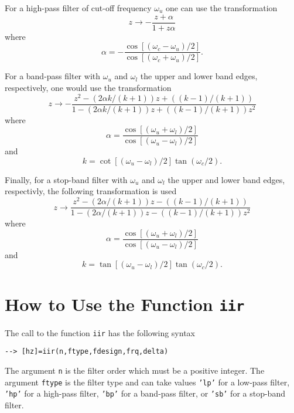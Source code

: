 	For a high-pass filter of cut-off frequency $\omega_u$ one can use
the transformation
%
\begin{equation}
z\rightarrow-\frac{z+\alpha}{1+z\alpha}
\label{e.iir.c}
\end{equation}
%
where
%
\begin{equation}
\alpha=-\frac{\cos[(\omega_c-\omega_u)/2]}{\cos[(\omega_c+\omega_u)/2]}.
\label{e.iir.d}
\end{equation}
%

	For a band-pass filter with $\omega_u$ and $\omega_l$
the upper and lower band edges, respectively, one would use the transformation
%
\begin{equation}
z\rightarrow-\frac{z^2-(2\alpha k/(k+1))z+((k-1)/(k+1))}{1-(2\alpha k/(k+1))z+((k-1)/(k+1))z^2}
\label{e.iir.e}
\end{equation}
%
where
%
\begin{equation}
\alpha=\frac{\cos[(\omega_u+\omega_l)/2]}{\cos[(\omega_u-\omega_l)/2]}
\label{e.iir.f}
\end{equation}
%
and
%
\begin{equation}
k=\cot[(\omega_u-\omega_l)/2]\tan(\omega_c/2).
\label{e.iir.g}
\end{equation}
%

	Finally, for a stop-band filter with $\omega_u$ and $\omega_l$
the upper and lower band edges, respectivly, the following transformation
is used
%
\begin{equation}
z\rightarrow\frac{z^2-(2\alpha/(k+1))z-((k-1)/(k+1))}{1-(2\alpha/(k+1))z-((k-1)/(k+1))z^2}
\label{e.iir.h}
\end{equation}
%
where
%
\begin{equation}
\alpha=\frac{\cos[(\omega_u+\omega_l)/2]}{\cos[(\omega_u-\omega_l)/2]}
\label{e.iir.i}
\end{equation}
%
and
%
\begin{equation}
k=\tan[(\omega_u-\omega_l)/2]\tan(\omega_c/2).
\label{e.iir.j}
\end{equation}
%
\section{How to Use the Function {\tt iir}}

	The call to the function {\tt iir} has the following syntax
\begin{verbatim}
--> [hz]=iir(n,ftype,fdesign,frq,delta)
\end{verbatim}
The argument {\tt n} is the filter order which must be a positive integer.
The argument {\tt ftype} is the filter type and can take values
{\tt 'lp'} for a low-pass filter, {\tt 'hp'} for a high-pass filter,
{\tt 'bp'} for a band-pass filter, or {\tt 'sb'} for a stop-band filter.

